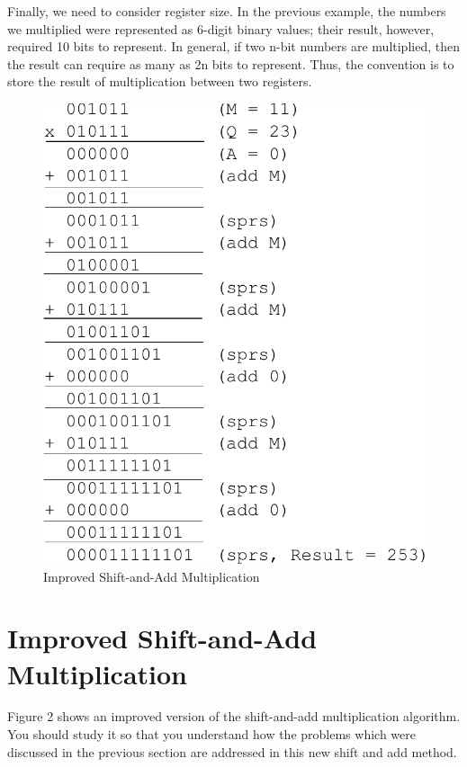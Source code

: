 \documentclass{article}
\begin{document}
Finally, we need to consider register size.
In the previous example, the numbers we multiplied were represented as 6-digit binary values; their result, however, required 10 bits to represent.
In general, if two n-bit numbers are multiplied, then the result can require as many as 2n bits to represent.
Thus, the convention is to store the result of multiplication between two registers.

\pagebreak

\begin{figure}
\centering
\includegraphics[scale=0.7]{isaam2.pdf}
\caption{Improved Shift-and-Add Multiplication}
\end{figure}

\section{Improved Shift-and-Add Multiplication}
Figure 2 shows an improved version of the shift-and-add multiplication algorithm.
You should study it so that you understand how the problems which were discussed in the previous section are addressed in this new shift and add method.
\end{document}
